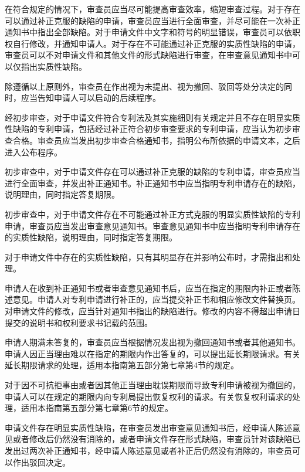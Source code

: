 在符合规定的情况下，审查员应当尽可能提高审查效率，缩短审查过程。对于存在可以通过补正克服的缺陷的申请，审查员应当进行全面审查，并尽可能在一次补正通知书中指出全部缺陷。对于申请文件中文字和符号的明显错误，审查员可以依职权自行修改，并通知申请人。对于存在不可能通过补正克服的实质性缺陷的申请，审查员可以不对申请文件和其他文件的形式缺陷进行审查，在审查意见通知书中可以仅指出实质性缺陷。

除遵循以上原则外，审查员在作出视为未提出、视为撤回、驳回等处分决定的同时，应当告知申请人可以启动的后续程序。

经初步审查，对于申请文件符合专利法及其实施细则有关规定并且不存在明显实质性缺陷的专利申请，包括经过补正符合初步审查要求的专利申请，应当认为初步审查合格。审查员应当发出初步审查合格通知书，指明公布所依据的申请文本，之后进入公布程序。

初步审查中，对于申请文件存在可以通过补正克服的缺陷的专利申请，审查员应当进行全面审查，并发出补正通知书。补正通知书中应当指明专利申请存在的缺陷，说明理由，同时指定答复期限。

初步审查中，对于申请文件存在不可能通过补正方式克服的明显实质性缺陷的专利申请，审查员应当发出审查意见通知书。审查意见通知书中应当指明专利申请存在的实质性缺陷，说明理由，同时指定答复期限。

对于申请文件中存在的实质性缺陷，只有其明显存在并影响公布时，才需指出和处理。

申请人在收到补正通知书或者审查意见通知书后，应当在指定的期限内补正或者陈述意见。申请人对专利申请进行补正的，应当提交补正书和相应修改文件替换页。对申请文件的修改，应当针对通知书指出的缺陷进行。修改的内容不得超出申请日提交的说明书和权利要求书记载的范围。

申请人期满未答复的，审查员应当根据情况发出视为撤回通知书或者其他通知书。申请人因正当理由难以在指定的期限内作出答复的，可以提出延长期限请求。有关延长期限请求的处理，适用本指南第五部分第七章第4节的规定。

对于因不可抗拒事由或者因其他正当理由耽误期限而导致专利申请被视为撤回的，申请人可以在规定的期限内向专利局提出恢复权利的请求。有关恢复权利请求的处理，适用本指南第五部分第七章第6节的规定。

申请文件存在明显实质性缺陷，在审查员发出审查意见通知书后，经申请人陈述意见或者修改后仍然没有消除的，或者申请文件存在形式缺陷，审查员针对该缺陷已发出过两次补正通知书，经申请人陈述意见或者补正后仍然没有消除的，审查员可以作出驳回决定。

